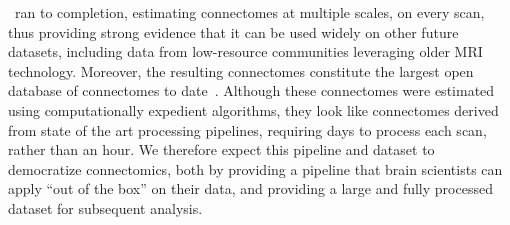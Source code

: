 \documentclass[11pt]{article}
\begin{document}
\ndmg~ran to completion, estimating connectomes at multiple scales, on every scan, thus providing strong evidence that it can be used widely on other future datasets, including data from low-resource communities leveraging older MRI technology.  Moreover, the resulting connectomes constitute  the largest open database of connectomes to date~\cite{brown2016connected}.  Although these connectomes were estimated using computationally expedient algorithms, they look like connectomes derived from state of the art processing pipelines, requiring days to process each scan, rather than an hour. We therefore expect this pipeline and dataset to democratize connectomics, both by providing a pipeline that brain scientists can apply ``out of the box'' on their data, and providing a large and fully processed dataset for subsequent analysis. 



\end{document}
